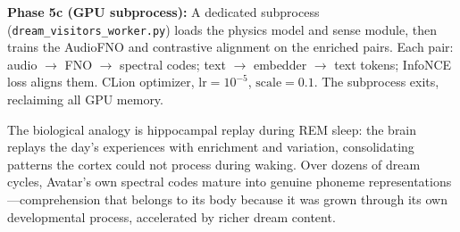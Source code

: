 \textbf{Phase 5c (GPU subprocess):} A dedicated subprocess
(\texttt{dream\_visitors\_worker.py}) loads the physics model and sense module,
then trains the AudioFNO and contrastive alignment on the enriched pairs. Each
pair: audio $\to$ FNO $\to$ spectral codes; text $\to$ embedder $\to$ text
tokens; InfoNCE loss aligns them. CLion optimizer, $\text{lr}=10^{-5}$,
$\text{scale}=0.1$. The subprocess exits, reclaiming all GPU memory.

The biological analogy is hippocampal replay during REM sleep: the brain
replays the day's experiences with enrichment and variation, consolidating
patterns the cortex could not process during waking. Over dozens of dream
cycles, Avatar's own spectral codes mature into genuine phoneme
representations---comprehension that belongs to its body because it was grown
through its own developmental process, accelerated by richer dream content.
